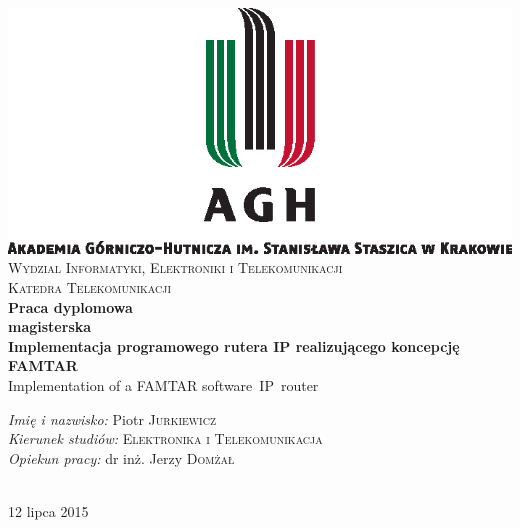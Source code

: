 \begin{titlepage}

\begin{center}

\includegraphics[scale=1.25]{agh_nzw_s_pl_1w_wbr_pms}\\[0.2cm]

\textsc{Wydzial Informatyki, Elektroniki i Telekomunikacji}\\[0.2cm]

\textsc{Katedra Telekomunikacji}\\[1cm]

\textbf{Praca dyplomowa \\ magisterska}\\[1cm]

{\huge \bfseries Implementacja programowego rutera IP realizującego koncepcję FAMTAR}\\[1cm]

{\huge Implementation of a FAMTAR software~IP~router}\\

\vfill

\begin{minipage}{0.8\textwidth}
\begin{flushleft}
{\large \emph{Imię i nazwisko:} \hfill Piotr \textsc{Jurkiewicz}}\\[0.1cm]
{\large \emph{Kierunek studiów:} \hfill \textsc{Elektronika i Telekomunikacja}}\\[0.1cm]
{\large \emph{Opiekun pracy:} \hfill dr inż. Jerzy \textsc{Domżał}}
\end{flushleft}
\end{minipage}\\[2cm]

12 lipca 2015

\end{center}

\end{titlepage}
